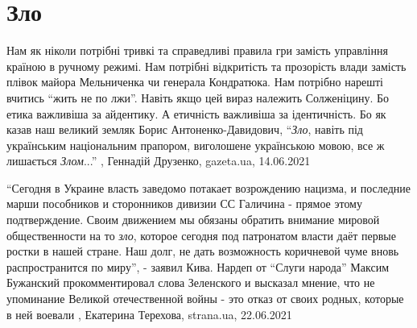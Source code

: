  
 
 
 
 
\chapter{Зло}
\label{sec:slova.zlo}

Нам як ніколи потрібні тривкі та справедливі правила гри замість управління
країною в ручному режимі. Нам потрібні відкритість та прозорість влади замість
плівок майора Мельниченка чи генерала Кондратюка. Нам потрібно нарешті вчитись
\enquote{жить не по лжи}. Навіть якщо цей вираз належить Солженіцину. Бо етика
важливіша за айдентику. А етичність важливіша за ідентичність. Бо як казав наш
великий земляк Борис Антоненко-Давидович, \enquote{\emph{Зло}, навіть під українським
національним прапором, виголошене українською мовою, все ж лишається \emph{Злом}...}
, 
Геннадій Друзенко, gazeta.ua, 14.06.2021

\enquote{Сегодня в Украине власть заведомо потакает возрождению нацизма, и последние
марши пособников и сторонников дивизии СС Галичина - прямое этому
подтверждение. Своим движением мы обязаны обратить внимание мировой
общественности на то \emph{зло}, которое сегодня под патронатом власти даёт первые
ростки в нашей стране. Наш долг, не дать возможность коричневой чуме вновь
распространится по миру}, - заявил Кива.  Нардеп от \enquote{Слуги народа} Максим
Бужанский прокомментировал слова Зеленского  и высказал мнение, что не
упоминание Великой отечественной войны - это отказ от своих родных, которые в
ней воевали
, Екатерина Терехова, strana.ua, 22.06.2021

